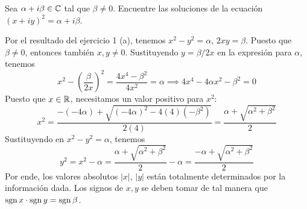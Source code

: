 \begin{exercise}
Sea $\alpha + i \beta \in \mathbb C$ tal que $\beta \ne 0$. Encuentre las soluciones de la ecuación $(x + iy)^2 = \alpha + i \beta$.
\end{exercise}

\begin{solution}
Por el resultado del ejercicio 1 (a), tenemos $x^2 - y^2 = \alpha$, $2xy = \beta$. Puesto que $\beta \ne 0$, entonces también $x, y \ne 0$. Sustituyendo $y = \beta / 2x$ en la expresión para $\alpha$, tenemos
$$x^2 - \left( \frac \beta {2x} \right)^2 = \frac {4x^4 - \beta^2} {4x^2} = \alpha \implies 4x^4 - 4\alpha x^2 - \beta^2 = 0$$
Puesto que $x \in \mathbb R$, necesitamos un valor positivo para $x^2$:
$$x^2 = \frac {-(-4\alpha) + \sqrt{(-4\alpha)^2 - 4(4)(-\beta^2)}} {2(4)} = \frac {\alpha + \sqrt {\alpha^2 + \beta^2}} 2$$
Sustituyendo en $x^2 - y^2 = \alpha$, tenemos
$$y^2 = x^2 - \alpha = \frac {\alpha + \sqrt {\alpha^2 + \beta^2}} 2 - \alpha = \frac {-\alpha + \sqrt {\alpha^2 + \beta^2}} 2$$
Por ende, los valores absolutos $|x|$, $|y|$ están totalmente determinados por la información dada. Los signos de $x, y$ se deben tomar de tal manera que $\operatorname{sgn} x \cdot \operatorname{sgn} y = \operatorname{sgn} \beta$.
\end{solution}
